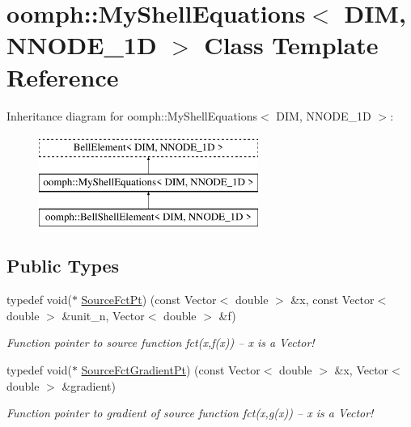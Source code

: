 \hypertarget{classoomph_1_1MyShellEquations}{}\section{oomph\+:\+:My\+Shell\+Equations$<$ D\+IM, N\+N\+O\+D\+E\+\_\+1D $>$ Class Template Reference}
\label{classoomph_1_1MyShellEquations}
Inheritance diagram for oomph\+:\+:My\+Shell\+Equations$<$ D\+IM, N\+N\+O\+D\+E\+\_\+1D $>$\+:\begin{figure}[H]
\begin{center}
\leavevmode
\includegraphics[height=3.000000cm]{classoomph_1_1MyShellEquations}
\end{center}
\end{figure}
\subsection*{Public Types}
\begin{DoxyCompactItemize}
\item 
typedef void($\ast$ \hyperlink{classoomph_1_1MyShellEquations_a056d2488b6e65787f5c9935a321b7a9b}{Source\+Fct\+Pt}) (const Vector$<$ double $>$ \&x, const Vector$<$ double $>$ \&unit\+\_\+n, Vector$<$ double $>$ \&f)
\begin{DoxyCompactList}\small\item\em Function pointer to source function fct(x,f(x)) -- x is a Vector! \end{DoxyCompactList}\item 
typedef void($\ast$ \hyperlink{classoomph_1_1MyShellEquations_a954dcc1b78710f331ed390b716aa07dd}{Source\+Fct\+Gradient\+Pt}) (const Vector$<$ double $>$ \&x, Vector$<$ double $>$ \&gradient)
\begin{DoxyCompactList}\small\item\em Function pointer to gradient of source function fct(x,g(x)) -- x is a Vector! \end{DoxyCompactList}\end{DoxyCompactItemize}
